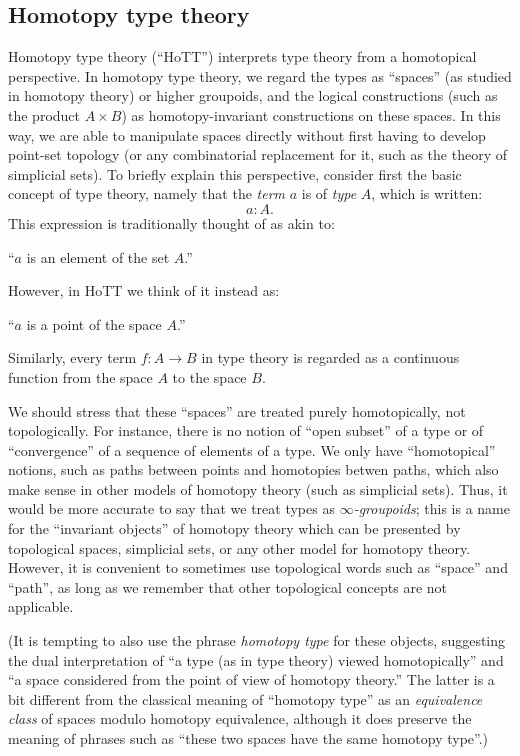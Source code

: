 \subsection*{Homotopy type theory}

Homotopy type theory (``HoTT'') interprets type theory from a homotopical perspective.
In homotopy type theory, we regard the types as ``spaces'' (as studied in homotopy theory) or higher groupoids, and the logical constructions (such as the product $A\times B$) as homotopy-invariant constructions on these spaces.
In this way, we are able to manipulate spaces directly without first having to develop point-set topology (or any combinatorial replacement for it, such as the theory of simplicial sets).
To briefly explain this perspective, consider first the basic concept of type theory, namely that
the \emph{term} $a$ is of \emph{type} $A$, which is written:
\[ a:A. \]
This expression is traditionally thought of as akin to:
\begin{center}
``$a$ is an element of the set $A$.''
\end{center}
However, in HoTT we think of it instead as:
\begin{center}
``$a$ is a point of the space $A$.''
\end{center}
Similarly, every term $f : A\to B$ in type theory is regarded as a continuous function from the space $A$ to the space $B$.

We should stress that these ``spaces'' are treated purely homotopically, not topologically.
For instance, there is no notion of ``open subset'' of a type or of ``convergence'' of a sequence of elements of a type.
We only have ``homotopical'' notions, such as paths between points and homotopies betwen paths, which also make sense in other models of homotopy theory (such as simplicial sets).
Thus, it would be more accurate to say that we treat types as \emph{$\infty$-groupoids}; this is a name for the ``invariant objects'' of homotopy theory which can be presented by topological spaces, simplicial sets, or any other model for homotopy theory.
However, it is convenient to sometimes use topological words such as ``space'' and ``path'', as long as we remember that other topological concepts are not applicable.

(It is tempting to also use the phrase \emph{homotopy type} for these objects, suggesting the dual interpretation of ``a type (as in type theory) viewed homotopically'' and ``a space considered from the point of view of homotopy theory.''
The latter is a bit different from the classical meaning of ``homotopy type'' as an \emph{equivalence class} of spaces modulo homotopy equivalence, although it does preserve the meaning of phrases such as ``these two spaces have the same homotopy type''.)

